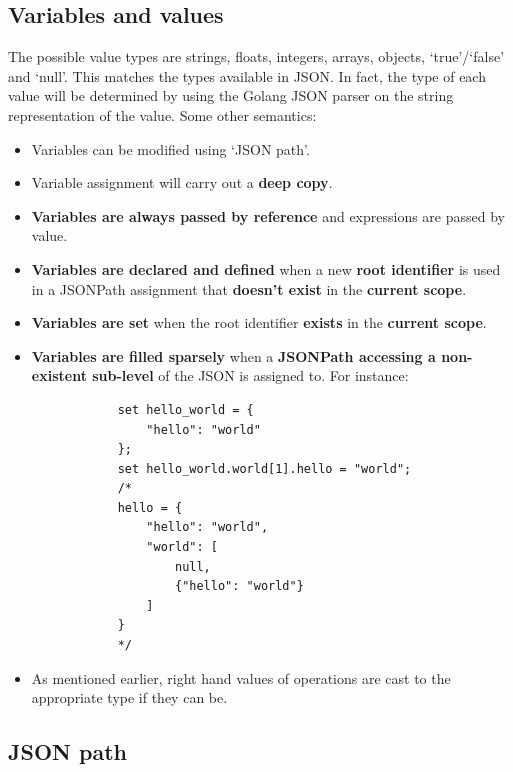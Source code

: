 \documentclass[]{interim}
\theoremstyle{definition}
\begin{document}
\subsection{Variables and values}

The possible value types are strings, floats, integers, arrays, objects, `true'/`false' and `null'. This matches the types available in JSON. In fact, the type of each value will be determined by using the Golang JSON parser on the string representation of the value. Some other semantics:

\begin{center}
    \begin{itemize} 
        \item Variables can be modified using `JSON path'.
        \item Variable assignment will carry out a \textbf{deep copy}.
        \item \textbf{Variables are always passed by reference} and expressions are passed by value.
        \item \textbf{Variables are declared and defined} when a new \textbf{root identifier} is used in a JSONPath assignment that \textbf{doesn't exist} in the \textbf{current scope}.
        \item \textbf{Variables are set} when the root identifier \textbf{exists} in the \textbf{current scope}.
        \item \textbf{Variables are filled sparsely} when a \textbf{JSONPath accessing a non-existent sub-level} of the JSON is assigned to. For instance:
        \begin{verbatim}
            set hello_world = {
                "hello": "world"
            };
            set hello_world.world[1].hello = "world";
            /*
            hello = {
                "hello": "world",
                "world": [
                    null,
                    {"hello": "world"}
                ]
            }
            */
        \end{verbatim}
        \item As mentioned earlier, right hand values of operations are cast to the appropriate type if they can be. 
    \end{itemize}
\end{center}

\subsection{JSON path}
\end{document}

